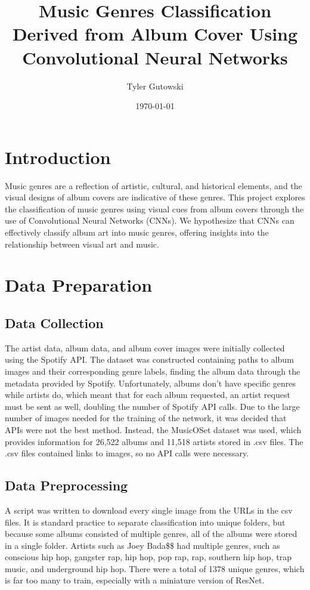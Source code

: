 \documentclass[12pt]{article}
\title{Music Genres Classification Derived from Album Cover Using Convolutional Neural Networks}
\author{Tyler Gutowski}
\date{\today}
\begin{document}
\maketitle

\section{Introduction}
Music genres are a reflection of artistic, cultural, and historical elements, and the visual designs of album covers are indicative of these genres. This project explores the classification of music genres using visual cues from album covers through the use of Convolutional Neural Networks (CNNs). We hypothesize that CNNs can effectively classify album art into music genres, offering insights into the relationship between visual art and music.

\section{Data Preparation}
\subsection{Data Collection}
The artist data, album data, and album cover images were initially collected using the Spotify API. The dataset was constructed containing paths to album images and their corresponding genre labels, finding the album data through the metadata provided by Spotify. Unfortunately, albums don't have specific genres while artists do, which meant that for each album requested, an artist request must be sent as well, doubling the number of Spotify API calls. Due to the large number of images needed for the training of the network, it was decided that APIs were not the best method. Instead, the MusicOSet dataset was used, which provides information for 26,522 albums and 11,518 artists stored in .csv files. The .csv files contained links to images, so no API calls were necessary.

\subsection{Data Preprocessing}
A script was written to download every single image from the URLs in the csv files. It is standard practice to separate classification into unique folders, but because some albums consisted of multiple genres, all of the albums were stored in a single folder. Artists such as Joey Bada\$\$ had multiple genres, such as conscious hip hop, gangster rap, hip hop, pop rap, rap, southern hip hop, trap music, and underground hip hop. There were a total of 1378 unique genres, which is far too many to train, especially with a miniature version of ResNet.
\end{document}
